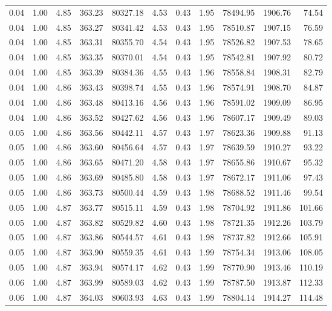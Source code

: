 \begin{table}[!ht]
\begin{tabular}{rrrrrrrrrrr}
0.04 & 1.00 & 4.85 & 363.23 & 80327.18 & 4.53 & 0.43 & 1.95 & 78494.95 & 1906.76 & 74.54 \\
0.04 & 1.00 & 4.85 & 363.27 & 80341.42 & 4.53 & 0.43 & 1.95 & 78510.87 & 1907.15 & 76.59 \\
0.04 & 1.00 & 4.85 & 363.31 & 80355.70 & 4.54 & 0.43 & 1.95 & 78526.82 & 1907.53 & 78.65 \\
0.04 & 1.00 & 4.85 & 363.35 & 80370.01 & 4.54 & 0.43 & 1.95 & 78542.81 & 1907.92 & 80.72 \\
0.04 & 1.00 & 4.85 & 363.39 & 80384.36 & 4.55 & 0.43 & 1.96 & 78558.84 & 1908.31 & 82.79 \\
0.04 & 1.00 & 4.86 & 363.43 & 80398.74 & 4.55 & 0.43 & 1.96 & 78574.91 & 1908.70 & 84.87 \\
0.04 & 1.00 & 4.86 & 363.48 & 80413.16 & 4.56 & 0.43 & 1.96 & 78591.02 & 1909.09 & 86.95 \\
0.04 & 1.00 & 4.86 & 363.52 & 80427.62 & 4.56 & 0.43 & 1.96 & 78607.17 & 1909.49 & 89.03 \\
0.05 & 1.00 & 4.86 & 363.56 & 80442.11 & 4.57 & 0.43 & 1.97 & 78623.36 & 1909.88 & 91.13 \\
0.05 & 1.00 & 4.86 & 363.60 & 80456.64 & 4.57 & 0.43 & 1.97 & 78639.59 & 1910.27 & 93.22 \\
0.05 & 1.00 & 4.86 & 363.65 & 80471.20 & 4.58 & 0.43 & 1.97 & 78655.86 & 1910.67 & 95.32 \\
0.05 & 1.00 & 4.86 & 363.69 & 80485.80 & 4.58 & 0.43 & 1.97 & 78672.17 & 1911.06 & 97.43 \\
0.05 & 1.00 & 4.86 & 363.73 & 80500.44 & 4.59 & 0.43 & 1.98 & 78688.52 & 1911.46 & 99.54 \\
0.05 & 1.00 & 4.87 & 363.77 & 80515.11 & 4.59 & 0.43 & 1.98 & 78704.92 & 1911.86 & 101.66 \\
0.05 & 1.00 & 4.87 & 363.82 & 80529.82 & 4.60 & 0.43 & 1.98 & 78721.35 & 1912.26 & 103.79 \\
0.05 & 1.00 & 4.87 & 363.86 & 80544.57 & 4.61 & 0.43 & 1.98 & 78737.82 & 1912.66 & 105.91 \\
0.05 & 1.00 & 4.87 & 363.90 & 80559.35 & 4.61 & 0.43 & 1.99 & 78754.34 & 1913.06 & 108.05 \\
0.05 & 1.00 & 4.87 & 363.94 & 80574.17 & 4.62 & 0.43 & 1.99 & 78770.90 & 1913.46 & 110.19 \\
0.06 & 1.00 & 4.87 & 363.99 & 80589.03 & 4.62 & 0.43 & 1.99 & 78787.50 & 1913.87 & 112.33 \\
0.06 & 1.00 & 4.87 & 364.03 & 80603.93 & 4.63 & 0.43 & 1.99 & 78804.14 & 1914.27 & 114.48 \\

\end{tabular}
\end{table}
